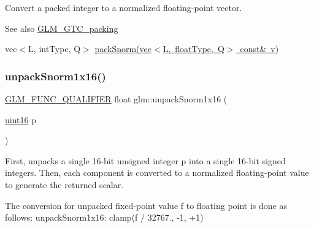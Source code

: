 Convert a packed integer to a normalized floating-\/point vector.

\begin{DoxySeeAlso}{See also}
\mbox{\hyperlink{group__gtc__packing}{G\+L\+M\+\_\+\+G\+T\+C\+\_\+packing}} 

vec$<$\+L, int\+Type, Q$>$ \mbox{\hyperlink{group__gtc__packing_gaa54b5855a750d6aeb12c1c902f5939b8}{pack\+Snorm(vec$<$\+L, float\+Type, Q$>$ const\& v)}} 
\end{DoxySeeAlso}
\mbox{\label{group__gtc__packing_ga246f451cebf590726324f7a283e3d65e}} 
\subsubsection{\texorpdfstring{unpack\+Snorm1x16()}{unpackSnorm1x16()}}
{\footnotesize\ttfamily \mbox{\hyperlink{setup_8hpp_a33fdea6f91c5f834105f7415e2a64407}{G\+L\+M\+\_\+\+F\+U\+N\+C\+\_\+\+Q\+U\+A\+L\+I\+F\+I\+ER}} float glm\+::unpack\+Snorm1x16 (\begin{DoxyParamCaption}\item[{\mbox{\hyperlink{group__gtc__type__precision_gad8c2939e1fdd8e5828b31d95c52255d5}{uint16}}}]{p }\end{DoxyParamCaption})}

First, unpacks a single 16-\/bit unsigned integer p into a single 16-\/bit signed integers. Then, each component is converted to a normalized floating-\/point value to generate the returned scalar.

The conversion for unpacked fixed-\/point value f to floating point is done as follows\+: unpack\+Snorm1x16\+: clamp(f / 32767., -\/1, +1)

